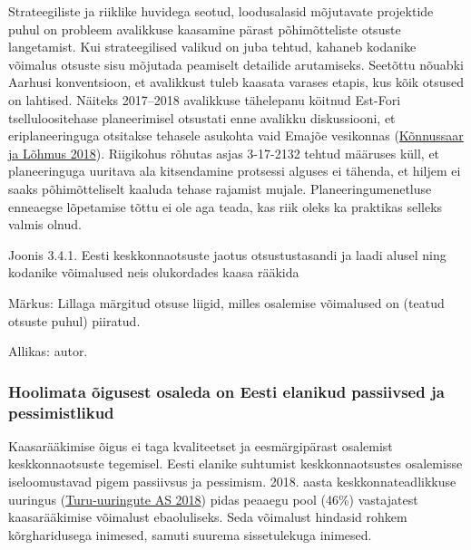 \documentclass[estonian,]{article}
\begin{document}
Strateegiliste ja riiklike huvidega seotud, loodusalasid mõjutavate projektide puhul on probleem avalikkuse kaasamine pärast põhimõtteliste otsuste langetamist. Kui strateegilised valikud on juba tehtud, kahaneb kodanike võimalus otsuste sisu mõjutada peamiselt detailide arutamiseks. Seetõttu nõuabki Aarhusi konventsioon, et avalikkust tuleb kaasata varases etapis, kus kõik otsused on lahtised. Näiteks 2017--2018 avalikkuse tähelepanu köitnud Est-Fori tselluloositehase planeerimisel otsustati enne avalikku diskussiooni, et eriplaneeringuga otsitakse tehasele asukohta vaid Emajõe vesikonnas (\protect\hyperlink{Konnussaar2018}{Kõnnussaar ja Lõhmus 2018}). Riigikohus rõhutas asjas 3-17-2132 tehtud määruses küll, et planeeringuga uuritava ala kitsendamine protsessi alguses ei tähenda, et hiljem ei saaks põhimõtteliselt kaaluda tehase rajamist mujale. Planeeringumenetluse enneaegse lõpetamise tõttu ei ole aga teada, kas riik oleks ka praktikas selleks valmis olnud.

{Joonis 3.4.1.} Eesti keskkonnaotsuste jaotus otsustustasandi ja laadi alusel ning kodanike võimalused neis olukordades kaasa rääkida

\begin{figure-comment}
{Märkus:} Lillaga märgitud otsuse liigid, milles osalemise võimalused on
(teatud otsuste puhul) piiratud.
\end{figure-comment}

\begin{imgsource}
{Allikas:} autor.
\end{imgsource}

\hypertarget{hoolimata-uxf5igusest-osaleda-on-eesti-elanikud-passiivsed-ja-pessimistlikud}{%
\subsubsection*{Hoolimata õigusest osaleda on Eesti elanikud passiivsed ja pessimistlikud}\label{hoolimata-uxf5igusest-osaleda-on-eesti-elanikud-passiivsed-ja-pessimistlikud}}

Kaasarääkimise õigus ei taga kvaliteetset ja eesmärgipärast osalemist keskkonnaotsuste tegemisel. Eesti elanike suhtumist keskkonnaotsustes osalemisse iseloomustavad pigem passiivsus ja pessimism. 2018. aasta keskkonnateadlikkuse uuringus (\protect\hyperlink{Turu-uuringute2018}{Turu-uuringute AS 2018}) pidas peaaegu pool (46\%) vastajatest kaasarääkimise võimalust ebaoluliseks. Seda võimalust hindasid rohkem kõrgharidusega inimesed, samuti suurema sissetulekuga inimesed.
\end{document}
